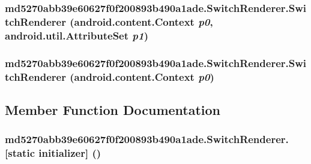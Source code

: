 \hypertarget{classmd5270abb39e60627f0f200893b490a1ade_1_1_switch_renderer_2dc3f9d51a00b56ed319cbf9b5dab267}{
\subsubsection[{SwitchRenderer}]{\setlength{\rightskip}{0pt plus 5cm}md5270abb39e60627f0f200893b490a1ade.SwitchRenderer.SwitchRenderer (android.content.Context {\em p0}, \/  android.util.AttributeSet {\em p1})}}
\label{classmd5270abb39e60627f0f200893b490a1ade_1_1_switch_renderer_2dc3f9d51a00b56ed319cbf9b5dab267}


\hypertarget{classmd5270abb39e60627f0f200893b490a1ade_1_1_switch_renderer_ea0207fcf836b5f128c00a9bfabce2cb}{
\subsubsection[{SwitchRenderer}]{\setlength{\rightskip}{0pt plus 5cm}md5270abb39e60627f0f200893b490a1ade.SwitchRenderer.SwitchRenderer (android.content.Context {\em p0})}}
\label{classmd5270abb39e60627f0f200893b490a1ade_1_1_switch_renderer_ea0207fcf836b5f128c00a9bfabce2cb}




\subsection{Member Function Documentation}
\hypertarget{classmd5270abb39e60627f0f200893b490a1ade_1_1_switch_renderer_1ec023784c291e40dea5636e84ab320b}{
\subsubsection[{[static initializer]}]{\setlength{\rightskip}{0pt plus 5cm}md5270abb39e60627f0f200893b490a1ade.SwitchRenderer.\mbox{[}static initializer\mbox{]} ()}}
\label{classmd5270abb39e60627f0f200893b490a1ade_1_1_switch_renderer_1ec023784c291e40dea5636e84ab320b}




